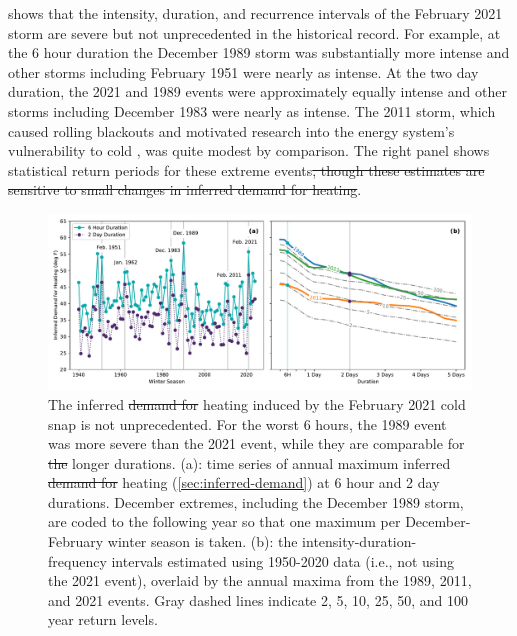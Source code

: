 \documentclass[12pt]{iopart}
\providecommand{\DIFaddtex}[1]{{\protect\color{blue}\uwave{#1}}} %
\providecommand{\DIFdeltex}[1]{{\protect\color{red}\sout{#1}}}                      %
\providecommand{\DIFdelbegin}{} %
\providecommand{\DIFdelend}{} %
\providecommand{\DIFaddFL}[1]{\DIFadd{#1}} %
\providecommand{\DIFdelFL}[1]{\DIFdel{#1}} %
\providecommand{\DIFaddbeginFL}{} %
\providecommand{\DIFaddendFL}{} %
\providecommand{\DIFdelbeginFL}{} %
\providecommand{\DIFdelendFL}{} %
\providecommand{\DIFadd}[1]{\texorpdfstring{\DIFaddtex{#1}}{#1}} %
\providecommand{\DIFdel}[1]{\texorpdfstring{\DIFdeltex{#1}}{}} %
\newcommand{\DIFscaledelfig}{0.5}
\newlength{\DIFdelgraphicswidth} %
\newlength{\DIFdelgraphicsheight} %
\newcommand{\DIFaddincludegraphics}[2][]{{\color{blue}\fbox{\DIFOincludegraphics[#1]{#2}}}} %
\newcommand{\DIFdelincludegraphics}[2][]{%
\sbox{\DIFdelgraphicsbox}{\DIFOincludegraphics[#1]{#2}}%
\settoboxwidth{\DIFdelgraphicswidth}{\DIFdelgraphicsbox} %
\settoboxtotalheight{\DIFdelgraphicsheight}{\DIFdelgraphicsbox} %
\scalebox{\DIFscaledelfig}{%
\parbox[b]{\DIFdelgraphicswidth}{\usebox{\DIFdelgraphicsbox}\\[-\baselineskip] \rule{\DIFdelgraphicswidth}{0em}}\llap{\resizebox{\DIFdelgraphicswidth}{\DIFdelgraphicsheight}{%
\setlength{\unitlength}{\DIFdelgraphicswidth}%
\begin{picture}(1,1)%
\thicklines\linethickness{2pt} %
{\color[rgb]{1,0,0}\put(0,0){\framebox(1,1){}}}%
{\color[rgb]{1,0,0}\put(0,0){\line( 1,1){1}}}%
{\color[rgb]{1,0,0}\put(0,1){\line(1,-1){1}}}%
\end{picture}%
}\hspace*{3pt}}} %
} %
\DeclareRobustCommand{\DIFdelbegin}{\DIFOdelbegin \let\includegraphics\DIFdelincludegraphics} %
\DeclareRobustCommand{\DIFdelend}{\DIFOaddend \let\includegraphics\DIFOincludegraphics} %
\DeclareRobustCommand{\DIFaddbeginFL}{\DIFOaddbeginFL \let\includegraphics\DIFaddincludegraphics} %
\DeclareRobustCommand{\DIFaddendFL}{\DIFOaddendFL \let\includegraphics\DIFOincludegraphics} %
\DeclareRobustCommand{\DIFdelbeginFL}{\DIFOdelbeginFL \let\includegraphics\DIFdelincludegraphics} %
\DeclareRobustCommand{\DIFdelendFL}{\DIFOaddendFL \let\includegraphics\DIFOincludegraphics} %
\begin{document}
 shows that the intensity, duration, and recurrence intervals of the February 2021 storm are severe but not unprecedented in the historical record.
For example, at the 6 hour duration the December 1989 storm was substantially more intense and other storms including February 1951 were nearly as intense.
At the two day duration, the 2021 and 1989 events were approximately equally intense and other storms including December 1983 were nearly as intense.
The 2011 storm, which caused rolling blackouts and motivated research into the energy system's vulnerability to cold \cite{ferc_outages:2011}, was quite modest by comparison.
The right panel shows statistical return periods for these extreme events\DIFdelbegin \DIFdel{, though these estimates are sensitive to small changes in inferred demand for heating}\DIFdelend .

\begin{figure}
  \centering
  \includegraphics[width=\textwidth]{ERCOT_HDD_IDF_MLE_popweighted.pdf}
  \caption{
    The inferred \DIFdelbeginFL \DIFdelFL{demand for }\DIFdelendFL heating \DIFaddbeginFL \DIFaddFL{demand per capita }\DIFaddendFL induced by the February 2021 cold snap is not unprecedented.
    For the worst 6 hours, the 1989 event was more severe than the 2021 event, while they are comparable for \DIFdelbeginFL \DIFdelFL{the }\DIFdelendFL longer durations.
    (a): time series of annual maximum inferred \DIFdelbeginFL \DIFdelFL{demand for }\DIFdelendFL heating \DIFaddbeginFL \DIFaddFL{demand per capita }\DIFaddendFL (\cref{sec:inferred-demand}) at 6 hour and 2 day durations.
    December extremes, including the December 1989 storm, are coded to the following year so that one maximum per December-February winter season is taken.
    (b): the intensity-duration-frequency intervals estimated using 1950-2020 data (i.e., not using the 2021 event), overlaid by the annual maxima from the 1989, 2011, and 2021 events.
    Gray dashed lines indicate 2, 5, 10, 25, 50, and 100 year return levels.
  }\label{fig:idf_weighted}
\end{figure}
\end{document}
